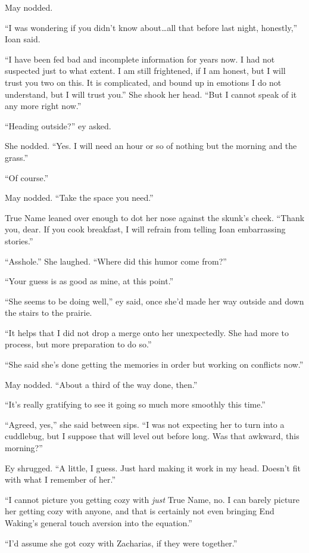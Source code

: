 May nodded.

``I was wondering if you didn't know about\ldots all that before last night, honestly,'' Ioan said.

``I have been fed bad and incomplete information for years now. I had not suspected just to what extent. I am still frightened, if I am honest, but I will trust you two on this. It is complicated, and bound up in emotions I do not understand, but I will trust you.'' She shook her head. ``But I cannot speak of it any more right now.''

``Heading outside?'' ey asked.

She nodded. ``Yes. I will need an hour or so of nothing but the morning and the grass.''

``Of course.''

May nodded. ``Take the space you need.''

True Name leaned over enough to dot her nose against the skunk's cheek. ``Thank you, dear. If you cook breakfast, I will refrain from telling Ioan embarrassing stories.''

``Asshole.'' She laughed. ``Where did this humor come from?''

``Your guess is as good as mine, at this point.''

``She seems to be doing well,'' ey said, once she'd made her way outside and down the stairs to the prairie.

``It helps that I did not drop a merge onto her unexpectedly. She had more to process, but more preparation to do so.''

``She said she's done getting the memories in order but working on conflicts now.''

May nodded. ``About a third of the way done, then.''

``It's really gratifying to see it going so much more smoothly this time.''

``Agreed, yes,'' she said between sips. ``I was not expecting her to turn into a cuddlebug, but I suppose that will level out before long. Was that awkward, this morning?''

Ey shrugged. ``A little, I guess. Just hard making it work in my head. Doesn't fit with what I remember of her.''

``I cannot picture you getting cozy with \emph{just} True Name, no. I can barely picture her getting cozy with anyone, and that is certainly not even bringing End Waking's general touch aversion into the equation.''

``I'd assume she got cozy with Zacharias, if they were together.''


